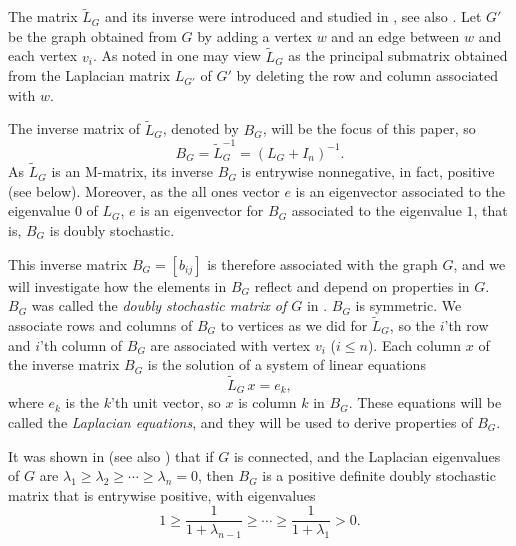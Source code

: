 \documentclass[12pt]{article}
\begin{document}
 The matrix $\tilde{L}_G$ and its inverse were introduced and studied in \cite{Golender,Merris}, see  also \cite{Chebotarev}.  Let $G'$ be the graph obtained from $G$ by adding a vertex $w$ and an edge between $w$ and each vertex $v_i$. As noted in \cite{Merris} one may view $\tilde{L}_G$ as the principal submatrix obtained from the Laplacian matrix $L_{G'}$ of $G'$ by deleting the row and column associated with $w$. 
 
 The inverse matrix of $\tilde{L}_G$, denoted by $B_G$, will be the focus of this paper, so  
 \begin{equation}
 \label{eq:define_B}
   B_G=\tilde{L}_G^{-1}=\left(L_G+I_n\right)^{-1}.
 \end{equation}  
 As $\tilde{L}_G$ is an M-matrix, its inverse $B_G$ is entrywise nonnegative, in fact, positive (see below). Moreover, as the all ones vector $e$ is an eigenvector associated to the eigenvalue $0$ of $L_G$, $e$ is an eigenvector for $B_G$ associated to the eigenvalue $1$, that is, $B_G$ is doubly stochastic. 
 
 This inverse matrix $B_G=[b_{ij}]$ is therefore associated with the graph $G$, and we will investigate how the elements in $B_G$ reflect and depend on properties in $G$. $B_G$ was  called the {\em doubly stochastic matrix of $G$} in \cite{Merris,Merris_II,Zhang05}. $B_G$ is symmetric. 
 We associate rows and columns of $B_G$ to vertices as we did for $\tilde{L}_G$, so the $i$'th row and $i$'th column of $B_G$ are associated with vertex $v_i$ ($i \le n$). Each column $x$ of the inverse matrix $B_G$ is the solution of a system of linear equations
 \begin{equation}
     \label{eq:Laplace_eq}   \tilde{L}_G\, x=e_k,
 \end{equation}
 where $e_k$ is the $k$'th unit vector, so $x$ is column $k$ in $B_G$. These  equations will be called the {\em Laplacian equations}, and they will be used to derive properties of $B_G$.

It was shown in \cite{Merris} (see also \cite{Chebotarev}) that if $G$ is connected, and the Laplacian eigenvalues of $G$ are $\lambda_1 \geq \lambda_2 \geq \cdots \ge  \lambda_{n}= 0$, then $B_G$ is a positive definite doubly stochastic matrix that is entrywise positive,
 with eigenvalues 
\[
1\ge\frac{1}{1+\lambda_{n-1}}\ge \cdots\ge \frac{1}{1+\lambda_{1}}>0.
\]
\end{document}
